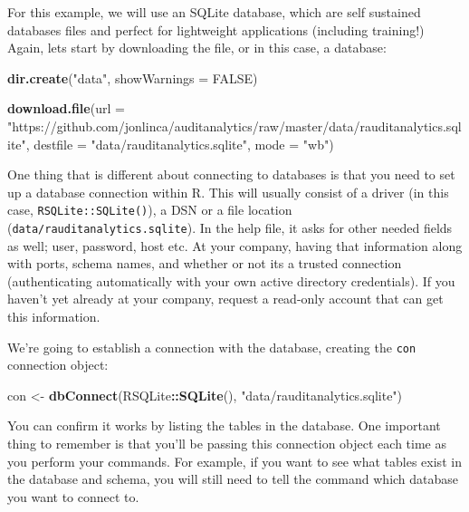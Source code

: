 \documentclass[
]{book}
\newenvironment{Shaded}{\begin{snugshade}}{\end{snugshade}}
\newcommand{\DataTypeTok}[1]{\textcolor[rgb]{0.13,0.29,0.53}{#1}}
\newcommand{\KeywordTok}[1]{\textcolor[rgb]{0.13,0.29,0.53}{\textbf{#1}}}
\newcommand{\NormalTok}[1]{#1}
\newcommand{\OperatorTok}[1]{\textcolor[rgb]{0.81,0.36,0.00}{\textbf{#1}}}
\newcommand{\OtherTok}[1]{\textcolor[rgb]{0.56,0.35,0.01}{#1}}
\newcommand{\StringTok}[1]{\textcolor[rgb]{0.31,0.60,0.02}{#1}}
\begin{document}
For this example, we will use an SQLite database, which are self sustained databases files and perfect for lightweight applications (including training!) Again, lets start by downloading the file, or in this case, a database:

\begin{Shaded}
\begin{Highlighting}[]
\KeywordTok{dir.create}\NormalTok{(}\StringTok{"data"}\NormalTok{, }\DataTypeTok{showWarnings =} \OtherTok{FALSE}\NormalTok{)}

\KeywordTok{download.file}\NormalTok{(}\DataTypeTok{url =} \StringTok{"https://github.com/jonlinca/auditanalytics/raw/master/data/rauditanalytics.sqlite"}\NormalTok{,}
             \DataTypeTok{destfile =} \StringTok{"data/rauditanalytics.sqlite"}\NormalTok{, }\DataTypeTok{mode =} \StringTok{"wb"}\NormalTok{)}
\end{Highlighting}
\end{Shaded}

One thing that is different about connecting to databases is that you need to set up a database connection within R. This will usually consist of a driver (in this case, \texttt{RSQLite::SQLite()}), a DSN or a file location (\texttt{data/rauditanalytics.sqlite}). In the help file, it asks for other needed fields as well; user, password, host etc. At your company, having that information along with ports, schema names, and whether or not its a trusted connection (authenticating automatically with your own active directory credentials). If you haven't yet already at your company, request a read-only account that can get this information.

We're going to establish a connection with the database, creating the \texttt{con} connection object:

\begin{Shaded}
\begin{Highlighting}[]
\NormalTok{con <-}\StringTok{ }\KeywordTok{dbConnect}\NormalTok{(RSQLite}\OperatorTok{::}\KeywordTok{SQLite}\NormalTok{(), }\StringTok{"data/rauditanalytics.sqlite"}\NormalTok{)}
\end{Highlighting}
\end{Shaded}

You can confirm it works by listing the tables in the database. One important thing to remember is that you'll be passing this connection object each time as you perform your commands. For example, if you want to see what tables exist in the database and schema, you will still need to tell the command which database you want to connect to.
\end{document}
